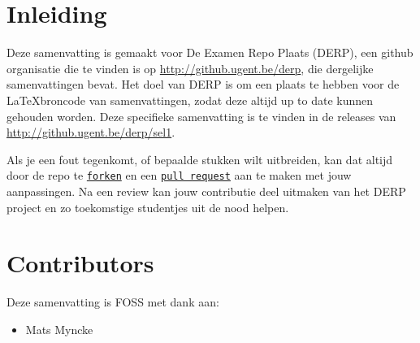
\section*{Inleiding}
\label{chap:Inleiding}


Deze samenvatting is gemaakt voor De Examen Repo Plaats (DERP), een github organisatie die te vinden is op \url{http://github.ugent.be/derp}, die dergelijke samenvattingen bevat. Het doel van DERP is om een plaats te hebben voor de \LaTeX\:broncode van samenvattingen, zodat deze altijd up to date kunnen gehouden worden. Deze specifieke samenvatting is te vinden in de releases van \url{http://github.ugent.be/derp/sel1}.

Als je een fout tegenkomt, of bepaalde stukken wilt uitbreiden, kan dat altijd door de repo te \href{https://help.github.com/articles/fork-a-repo/}{\texttt{forken}} en een \href{https://help.github.com/articles/using-pull-requests/}{\texttt{pull request}} aan te maken met jouw aanpassingen. Na een review kan jouw contributie deel uitmaken van het DERP project en zo toekomstige studentjes uit de nood helpen.

\section*{Contributors}
Deze samenvatting is FOSS met dank aan:
\begin{itemize}
\item Mats Myncke
\end{itemize}


\newpage